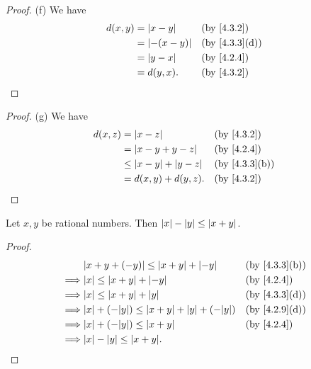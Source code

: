 \begin{proof}{(f)}
  We have
  \begin{align*}
    d(x, y) & = \abs{x - y}    &  & \text{(by \cref{4.3.2})}    \\
            & = \abs{-(x - y)} &  & \text{(by \cref{4.3.3}(d))} \\
            & = \abs{y - x}    &  & \text{(by \cref{4.2.4})}    \\
            & = d(y, x).       &  & \text{(by \cref{4.3.2})}
  \end{align*}
\end{proof}

\begin{proof}{(g)}
  We have
  \begin{align*}
    d(x, z) & = \abs{x - z}                  &  & \text{(by \cref{4.3.2})}    \\
            & = \abs{x - y + y - z}          &  & \text{(by \cref{4.2.4})}    \\
            & \leq \abs{x - y} + \abs{y - z} &  & \text{(by \cref{4.3.3}(b))} \\
            & = d(x, y) + d(y, z).           &  & \text{(by \cref{4.3.2})}    \\
  \end{align*}
\end{proof}

\begin{ac}\label{ac:4.3.1}
  Let \(x, y\) be rational numbers.
  Then \(\left\lvert x\right\rvert - \left\lvert y\right\rvert \leq \left\lvert x + y\right\rvert\).
\end{ac}

\begin{proof}
  \begin{align*}
             & \abs{x + y + (-y)} \leq \abs{x + y} + \abs{-y}               &  & \text{(by \cref{4.3.3}(b))} \\
    \implies & \abs{x} \leq \abs{x + y} + \abs{-y}                          &  & \text{(by \cref{4.2.4})}    \\
    \implies & \abs{x} \leq \abs{x + y} + \abs{y}                           &  & \text{(by \cref{4.3.3}(d))} \\
    \implies & \abs{x} + (-\abs{y}) \leq \abs{x + y} + \abs{y} + (-\abs{y}) &  & \text{(by \cref{4.2.9}(d))} \\
    \implies & \abs{x} + (-\abs{y}) \leq \abs{x + y}                        &  & \text{(by \cref{4.2.4})}    \\
    \implies & \abs{x} - \abs{y} \leq \abs{x + y}.
  \end{align*}
\end{proof}

